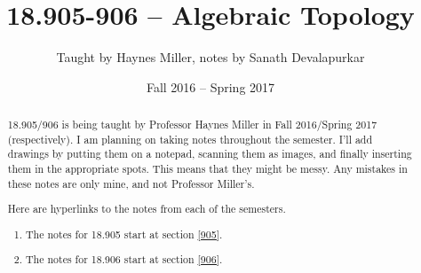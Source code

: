 \documentclass[12pt]{amsart}
\theoremstyle{theorem}
\theoremstyle{definition}
\begin{document}
\title{18.905-906 -- Algebraic Topology}
\author{Taught by Haynes Miller, notes by Sanath Devalapurkar}
\date{Fall 2016 -- Spring 2017}
\maketitle
\begin{abstract}
18.905/906 is being taught by Professor Haynes Miller in Fall 2016/Spring 2017 (respectively). I am planning on taking notes throughout the semester. I'll add drawings by putting them on a notepad, scanning them as images, and finally inserting them in the appropriate spots. This means that they might be messy. Any mistakes in these notes are only mine, and not Professor Miller's.

Here are hyperlinks to the notes from each of the semesters.
    \begin{enumerate}
        \item The notes for 18.905 start at section \ref{905}.
        \item The notes for 18.906 start at section \ref{906}.
    \end{enumerate}
\end{abstract}
\tableofcontents
\newpage

\newpage

\end{document}
